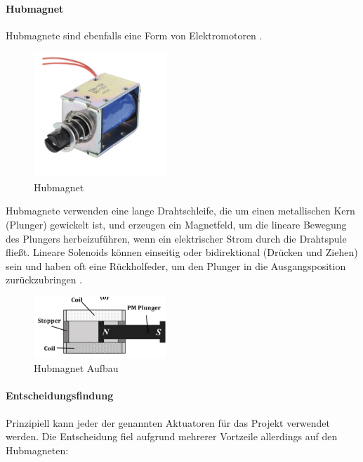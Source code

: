 \paragraph{Hubmagnet}
Hubmagnete sind ebenfalls eine Form von Elektromotoren \cite*[vgl.][Kapitel 1-2]{SolenoidDesign}.

\begin{figure}[htbp]
	\centering
	\includegraphics[width=5cm]{img/Hubmagnet}
	\caption{Hubmagnet \cite*{rei.ReicheltLinearerServomotor.}}
	\label{fig:Hubmagnet}
\end{figure}

Hubmagnete verwenden eine lange
Drahtschleife, die um einen metallischen Kern (Plunger) gewickelt ist, und erzeugen ein Magnetfeld, um die lineare Bewegung
des Plungers herbeizuführen, wenn ein elektrischer Strom durch die Drahtspule fließt. Lineare Solenoids können einseitig oder
bidirektional (Drücken und Ziehen) sein und haben oft eine Rückholfeder, um den Plunger in die Ausgangsposition zurückzubringen \cite*[vgl.][Kapitel 1-2]{SolenoidDesign}.

\begin{figure}[htbp]
	\centering
	\includegraphics[width=5cm]{img/AufbauMagnet}
	\caption{Hubmagnet Aufbau \cite*{SolenoidDesign}}
	\label{fig:HubmagnetAufbau}
\end{figure}

\paragraph{Entscheidungsfindung}
Prinzipiell kann jeder der genannten Aktuatoren für das Projekt verwendet werden. Die Entscheidung fiel aufgrund
mehrerer Vortzeile allerdings auf den Hubmagneten:

